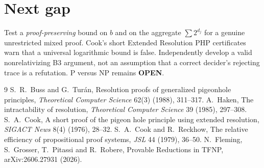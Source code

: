 \documentclass[11pt]{article}
\begin{document}
\section*{Next gap}
Test a \emph{proof-preserving} bound on $b$ and on the aggregate $\sum 2^{d_j}$ for a genuine unrestricted mixed proof. Cook's short Extended Resolution PHP certificates warn that a universal logarithmic bound is false. Independently develop a valid nonrelativizing B3 argument, not an assumption that a correct decider's rejecting trace is a refutation. P versus NP remains \textbf{OPEN}.

\begin{thebibliography}{9}
 S.~R.~Buss and G.~Tur\'an, Resolution proofs of generalized pigeonhole principles, \emph{Theoretical Computer Science} 62(3) (1988), 311--317.
 A.~Haken, The intractability of resolution, \emph{Theoretical Computer Science} 39 (1985), 297--308.
 S.~A.~Cook, A short proof of the pigeon hole principle using extended resolution, \emph{SIGACT News} 8(4) (1976), 28--32.
 S.~A.~Cook and R.~Reckhow, The relative efficiency of propositional proof systems, \emph{JSL} 44 (1979), 36--50.
 N.~Fleming, S.~Grosser, T.~Pitassi and R.~Robere, Provable Reductions in TFNP, arXiv:2606.27931 (2026).
\end{thebibliography}
\end{document}
